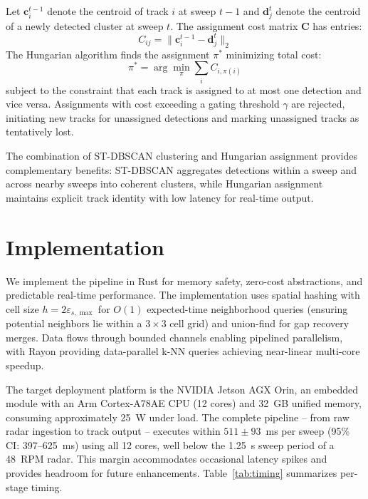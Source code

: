 \documentclass[conf]{new-aiaa}
\begin{document}
Let $\mathbf{c}_i^{t-1}$ denote the centroid of track $i$ at sweep $t-1$ and $\mathbf{d}_j^t$ denote the centroid of a newly detected cluster at sweep $t$. The assignment cost matrix $\mathbf{C}$ has entries:
\begin{equation}
    C_{ij} = \| \mathbf{c}_i^{t-1} - \mathbf{d}_j^t \|_2
\end{equation}
The Hungarian algorithm finds the assignment $\pi^*$ minimizing total cost:
\begin{equation}
    \pi^* = \arg\min_{\pi} \sum_i C_{i,\pi(i)}
\end{equation}
subject to the constraint that each track is assigned to at most one detection and vice versa. Assignments with cost exceeding a gating threshold $\gamma$ are rejected, initiating new tracks for unassigned detections and marking unassigned tracks as tentatively lost.

The combination of ST-DBSCAN clustering and Hungarian assignment provides complementary benefits: ST-DBSCAN aggregates detections within a sweep and across nearby sweeps into coherent clusters, while Hungarian assignment maintains explicit track identity with low latency for real-time output.

\section{Implementation}

We implement the pipeline in Rust for memory safety, zero-cost abstractions, and predictable real-time performance. The implementation uses spatial hashing with cell size $h = 2\varepsilon_{s,\max}$ for $O(1)$ expected-time neighborhood queries (ensuring potential neighbors lie within a $3 \times 3$ cell grid) and union-find for gap recovery merges. Data flows through bounded channels enabling pipelined parallelism, with Rayon providing data-parallel k-NN queries achieving near-linear multi-core speedup.

The target deployment platform is the NVIDIA Jetson AGX Orin, an embedded module with an Arm Cortex-A78AE CPU (12 cores) and 32~GB unified memory, consuming approximately 25~W under load. The complete pipeline -- from raw radar ingestion to track output -- executes within $511 \pm 93$~ms per sweep (95\% CI: 397--625~ms) using all 12 cores, well below the 1.25~s sweep period of a 48~RPM radar. This margin accommodates occasional latency spikes and provides headroom for future enhancements. Table~\ref{tab:timing} summarizes per-stage timing.
\end{document}

